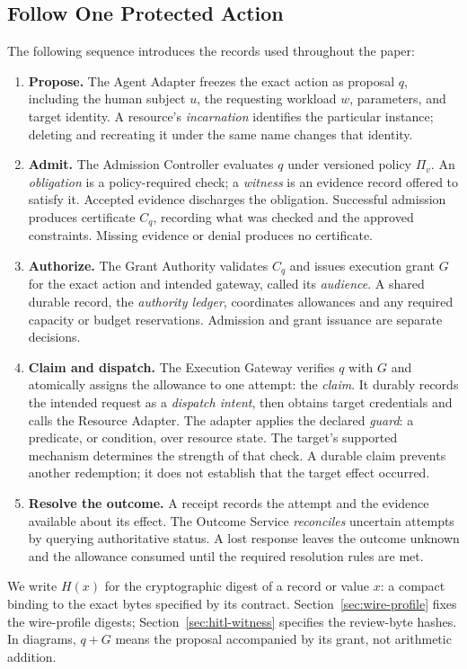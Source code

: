 \subsection{Follow One Protected Action}
The following sequence introduces the records used throughout the paper:
\begin{enumerate}
\item \textbf{Propose.} The Agent Adapter freezes the exact action as proposal $q$, including the human subject $u$, the requesting workload $w$, parameters, and target identity. A resource's \emph{incarnation} identifies the particular instance; deleting and recreating it under the same name changes that identity.
\item \textbf{Admit.} The Admission Controller evaluates $q$ under versioned policy $\Pi_v$. An \emph{obligation} is a policy-required check; a \emph{witness} is an evidence record offered to satisfy it. Accepted evidence discharges the obligation. Successful admission produces certificate $C_q$, recording what was checked and the approved constraints. Missing evidence or denial produces no certificate.
\item \textbf{Authorize.} The Grant Authority validates $C_q$ and issues execution grant $G$ for the exact action and intended gateway, called its \emph{audience}. A shared durable record, the \emph{authority ledger}, coordinates allowances and any required capacity or budget reservations. Admission and grant issuance are separate decisions.
\item \textbf{Claim and dispatch.} The Execution Gateway verifies $q$ with $G$ and atomically assigns the allowance to one attempt: the \emph{claim}. It durably records the intended request as a \emph{dispatch intent}, then obtains target credentials and calls the Resource Adapter. The adapter applies the declared \emph{guard}: a predicate, or condition, over resource state. The target's supported mechanism determines the strength of that check. A durable claim prevents another redemption; it does not establish that the target effect occurred.
\item \textbf{Resolve the outcome.} A receipt records the attempt and the evidence available about its effect. The Outcome Service \emph{reconciles} uncertain attempts by querying authoritative status. A lost response leaves the outcome unknown and the allowance consumed until the required resolution rules are met.
\end{enumerate}

We write $H(x)$ for the cryptographic digest of a record or value $x$: a compact binding to the exact bytes specified by its contract. Section~\ref{sec:wire-profile} fixes the wire-profile digests; Section~\ref{sec:hitl-witness} specifies the review-byte hashes. In diagrams, $q+G$ means the proposal accompanied by its grant, not arithmetic addition.

